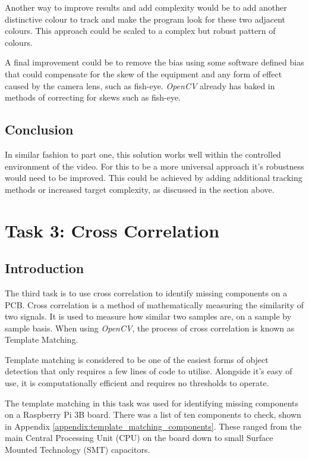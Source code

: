 \documentclass[conference]{IEEEtran}
\begin{document}
Another way to improve results and add complexity would be to add another distinctive colour to track and make the program look for these two adjacent colours. This approach could be scaled to a complex but robust pattern of colours. 

A final improvement could be to remove the bias using some software defined bias that could compensate for the skew of the equipment and any form of effect caused by the camera lens, such as fish-eye. \textit{OpenCV} already has baked in methods of correcting for skews such as fish-eye. \cite{ref:fish-eye}

\subsection{Conclusion}

In similar fashion to part one, this solution works well within the controlled environment of the video. For this to be a more universal approach it's robustness would need to be improved. This could be achieved by adding additional tracking methods or increased target complexity, as discussed in the section above.  

\section{Task 3: Cross Correlation} 

\subsection{Introduction}

The third task is to use cross correlation to identify missing components on a PCB. Cross correlation is a method of mathematically measuring the similarity of two signals. It is used to measure how similar two samples are, on a sample by sample basis. \cite{ref:what_is_cross_corrilation} When using \textit{OpenCV}, the process of cross correlation is known as Template Matching. \cite{ref:open_cv_templae_matching}

Template matching is considered to be one of the easiest forms of object detection that only requires a few lines of code to utilise. Alongside it's easy of use, it is computationally efficient and requires no thresholds to operate. \cite{ref:open_cv_templae_matching}

The template matching in this task was used for identifying missing components on a Raspberry Pi 3B board. There was a list of ten components to check, shown in Appendix \ref{appendix:template_matching_components}. These ranged from the main Central Processing Unit (CPU) on the board down to small Surface Mounted Technology (SMT) capacitors. 
\end{document}
